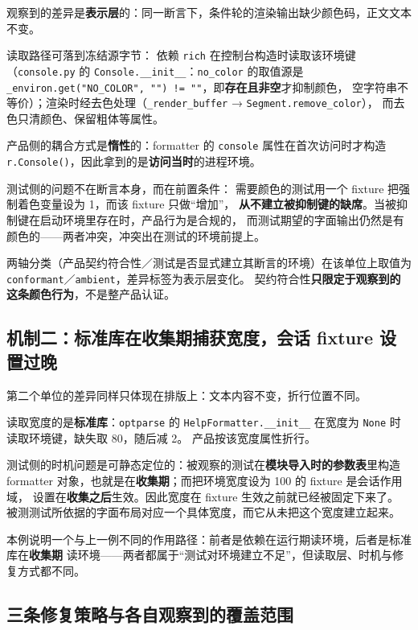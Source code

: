 \documentclass[11pt]{ctexart}
\begin{document}
观察到的差异是\textbf{表示层}的：同一断言下，条件轮的渲染输出缺少颜色码，正文文本不变。

读取路径可落到冻结源字节：
依赖 \texttt{rich} 在控制台构造时读取该环境键
（\texttt{console.py} 的 \texttt{Console.\_\_init\_\_}：\texttt{no\_color} 的取值源是
\texttt{\_environ.get("NO\_COLOR", "") != ""}，即\textbf{存在且非空}才抑制颜色，
空字符串不等价）；渲染时经去色处理（\texttt{\_render\_buffer} → \texttt{Segment.remove\_color}），
而去色只清颜色、保留粗体等属性。

产品侧的耦合方式是\textbf{惰性}的：formatter 的 \texttt{console} 属性在首次访问时才构造
\texttt{r.Console()}，因此拿到的是\textbf{访问当时}的进程环境。

测试侧的问题不在断言本身，而在前置条件：
需要颜色的测试用一个 fixture 把强制着色变量设为 1，而该 fixture 只做“增加”，
\textbf{从不建立被抑制键的缺席}。当被抑制键在启动环境里存在时，产品行为是合规的，
而测试期望的字面输出仍然是有颜色的——两者冲突，冲突出在测试的环境前提上。

两轴分类（产品契约符合性／测试是否显式建立其断言的环境）在该单位上取值为
\texttt{conformant}／\texttt{ambient}，差异标签为表示层变化。
契约符合性\textbf{只限定于观察到的这条颜色行为}，不是整产品认证。

\subsection{机制二：标准库在收集期捕获宽度，会话 fixture 设置过晚}

第二个单位的差异同样只体现在排版上：文本内容不变，折行位置不同。

读取宽度的是\textbf{标准库}：\texttt{optparse} 的 \texttt{HelpFormatter.\_\_init\_\_}
在宽度为 \texttt{None} 时读取环境键，缺失取 80，随后减 2。
产品按该宽度属性折行。

测试侧的时机问题是可静态定位的：被观察的测试在\textbf{模块导入时的参数表}里构造
formatter 对象，也就是在\textbf{收集期}；而把环境宽度设为 100 的 fixture 是会话作用域，
设置在\textbf{收集之后}生效。因此宽度在 fixture 生效之前就已经被固定下来了。
被测测试所依据的字面布局对应一个具体宽度，而它从未把这个宽度建立起来。

本例说明一个与上一例不同的作用路径：前者是依赖在运行期读环境，后者是标准库在\textbf{收集期}
读环境——两者都属于“测试对环境建立不足”，但读取层、时机与修复方式都不同。

\subsection{三条修复策略与各自观察到的覆盖范围}
\end{document}

